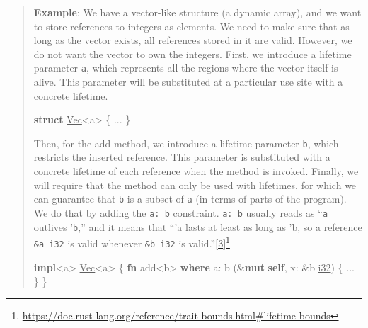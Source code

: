 \documentclass[
  11pt,
  twoside,symmetric]{report}
\newenvironment{Shaded}{}{}
\newcommand{\DataTypeTok}[1]{\underline{#1}}
\newcommand{\KeywordTok}[1]{\textbf{#1}}
\newcommand{\NormalTok}[1]{#1}
\newcommand{\OperatorTok}[1]{#1}
\newcommand{\OtherTok}[1]{#1}
\DeclareRobustCommand{\href}[2]{#2\footnote{\url{#1}}}
\begin{document}
\begin{quote}
\textbf{Example}: We have a vector-like structure (a dynamic array), and
we want to store references to integers as elements. We need to make
sure that as long as the vector exists, all references stored in it are
valid. However, we do not want the vector to own the integers. First, we
introduce a lifetime parameter \texttt{\textquotesingle{}a}, which
represents all the regions where the vector itself is alive. This
parameter will be substituted at a particular use site with a concrete
lifetime.

\begin{Shaded}
\begin{Highlighting}[]
\KeywordTok{struct} \DataTypeTok{Vec}\OperatorTok{\textless{}}\OtherTok{\textquotesingle{}a}\OperatorTok{\textgreater{}} \OperatorTok{\{} \OperatorTok{...} \OperatorTok{\}}
\end{Highlighting}
\end{Shaded}

Then, for the add method, we introduce a lifetime parameter
\texttt{\textquotesingle{}b}, which restricts the inserted reference.
This parameter is substituted with a concrete lifetime of each reference
when the method is invoked. Finally, we will require that the method can
only be used with lifetimes, for which we can guarantee that
\texttt{\textquotesingle{}b} is a subset of \texttt{\textquotesingle{}a}
(in terms of parts of the program). We do that by adding the
\texttt{\textquotesingle{}a:\ \textquotesingle{}b} constraint.
\texttt{\textquotesingle{}a:\ \textquotesingle{}b} usually reads as
``\texttt{\textquotesingle{}a} outlives '\texttt{b},'' and it means that
``'a lasts at least as long as 'b, so a reference
\texttt{\&\textquotesingle{}a\ i32} is valid whenever
\texttt{\&\textquotesingle{}b\ i32} is
valid.''\href{https://doc.rust-lang.org/reference/trait-bounds.html\#lifetime-bounds}{\protect\hyperlink{ref-reference}{{[}3{]}}}

\begin{Shaded}
\begin{Highlighting}[]
\KeywordTok{impl}\OperatorTok{\textless{}}\OtherTok{\textquotesingle{}a}\OperatorTok{\textgreater{}} \DataTypeTok{Vec}\OperatorTok{\textless{}}\OtherTok{\textquotesingle{}a}\OperatorTok{\textgreater{}} \OperatorTok{\{}
  \KeywordTok{fn}\NormalTok{ add}\OperatorTok{\textless{}}\OtherTok{\textquotesingle{}b}\OperatorTok{\textgreater{}} \KeywordTok{where} \OtherTok{\textquotesingle{}a}\OperatorTok{:} \OtherTok{\textquotesingle{}b}\NormalTok{ (}\OperatorTok{\&}\KeywordTok{mut} \KeywordTok{self}\OperatorTok{,}\NormalTok{ x}\OperatorTok{:} \OperatorTok{\&}\OtherTok{\textquotesingle{}b} \DataTypeTok{i32}\NormalTok{) }\OperatorTok{\{} \OperatorTok{...} \OperatorTok{\}}
\OperatorTok{\}}
\end{Highlighting}
\end{Shaded}
\end{quote}
\end{document}
